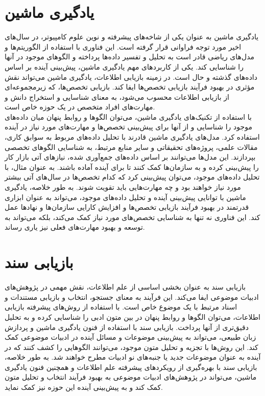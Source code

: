 \section{یادگیری ماشین}
\hspace*{2em}
یادگیری ماشین به عنوان یکی از شاخه‌های پیشرفته و نوین علوم کامپیوتر، در سال‌های اخیر مورد توجه فراوانی قرار گرفته است. این فناوری با استفاده از الگوریتم‌ها و مدل‌های ریاضی قادر است به تحلیل و تفسیر داده‌ها پرداخته و الگوهای موجود در آنها را شناسایی کند. یکی از کاربردهای مهم یادگیری ماشین، پیش‌بینی آینده بر اساس داده‌های گذشته و حال است. در زمینه بازیابی اطلاعات، یادگیری ماشین می‌تواند نقش مؤثری در بهبود فرآیند بازیابی تخصص‌ها ایفا کند. بازیابی تخصص‌ها، که زیرمجموعه‌ای از بازیابی اطلاعات محسوب می‌شود، به معنای شناسایی و استخراج دانش و مهارت‌های افراد متخصص در یک حوزه خاص است.
\\
با استفاده از تکنیک‌های یادگیری ماشین، می‌توان الگوها و روابط پنهان میان داده‌های موجود را شناسایی و از آنها برای پیش‌بینی تخصص‌ها و مهارت‌های مورد نیاز در آینده استفاده کرد. مدل‌های یادگیری ماشین قادرند با تحلیل داده‌های مربوط به سوابق کاری، مقالات علمی، پروژه‌های تحقیقاتی و سایر منابع مرتبط، به شناسایی الگوهای تخصصی بپردازند. این مدل‌ها می‌توانند بر اساس داده‌های جمع‌آوری شده، نیازهای آتی بازار کار را پیش‌بینی کرده و به سازمان‌ها کمک کنند تا برای آینده آماده باشند. به عنوان مثال، با تحلیل داده‌های موجود، می‌توان پیش‌بینی کرد که کدام تخصص‌ها در سال‌های آتی بیشتر مورد نیاز خواهند بود و چه مهارت‌هایی باید تقویت شوند. به طور خلاصه، یادگیری ماشین با توانایی پیش‌بینی آینده و تحلیل داده‌های موجود، می‌تواند به عنوان ابزاری قدرتمند در بهبود فرآیند بازیابی تخصص‌ها و افزایش کارایی سازمان‌ها و نهادها عمل کند. این فناوری نه تنها به شناسایی تخصص‌های مورد نیاز کمک می‌کند، بلکه می‌تواند به توسعه و بهبود مهارت‌های فعلی نیز یاری رساند.

\section{بازیابی سند}
\hspace*{2em}
بازیابی سند به عنوان بخشی اساسی از علم اطلاعات، نقش مهمی در پژوهش‌های ادبیات موضوعی ایفا می‌کند. این فرآیند به معنای جستجو، انتخاب و بازیابی مستندات و اسناد مرتبط با یک موضوع خاص است. با استفاده از روش‌های پیشرفته بازیابی اطلاعات، می‌توان الگوها و روابط پنهان در بین متون ادبی را شناسایی کرده و به تحلیل دقیق‌تری از آنها پرداخت. بازیابی سند با استفاده از فنون یادگیری ماشین و پردازش زبان طبیعی، می‌تواند به پیش‌بینی موضوعات و مسائل آینده در ادبیات موضوعی کمک کند. این روش‌ها با تجزیه و تحلیل متون موجود، می‌توانند الگوهایی را کشف کنند که در آینده به عنوان موضوعات جدید یا جنبه‌های نو ادبیات مطرح خواهند شد. به طور خلاصه، بازیابی سند با بهره‌گیری از رویکردهای پیشرفته علم اطلاعات و همچنین فنون یادگیری ماشین، می‌تواند در پژوهش‌های ادبیات موضوعی به بهبود فرآیند انتخاب و تحلیل متون کمک کند و به پیش‌بینی آینده این حوزه نیز کمک نماید.


